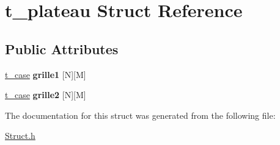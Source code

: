 \hypertarget{structt__plateau}{}\section{t\+\_\+plateau Struct Reference}
\label{structt__plateau}
\subsection*{Public Attributes}
\begin{DoxyCompactItemize}
\item 
\hypertarget{structt__plateau_af9ec4fe4fab6c92231a8a13a09bf7596}{}\hyperlink{structt__case}{t\+\_\+case} {\bfseries grille1} \mbox{[}N\mbox{]}\mbox{[}M\mbox{]}\label{structt__plateau_af9ec4fe4fab6c92231a8a13a09bf7596}

\item 
\hypertarget{structt__plateau_a3bffa4b223e7c4b44521ffb4f0de024a}{}\hyperlink{structt__case}{t\+\_\+case} {\bfseries grille2} \mbox{[}N\mbox{]}\mbox{[}M\mbox{]}\label{structt__plateau_a3bffa4b223e7c4b44521ffb4f0de024a}

\end{DoxyCompactItemize}


The documentation for this struct was generated from the following file\+:\begin{DoxyCompactItemize}
\item 
\hyperlink{_struct_8h}{Struct.\+h}\end{DoxyCompactItemize}
